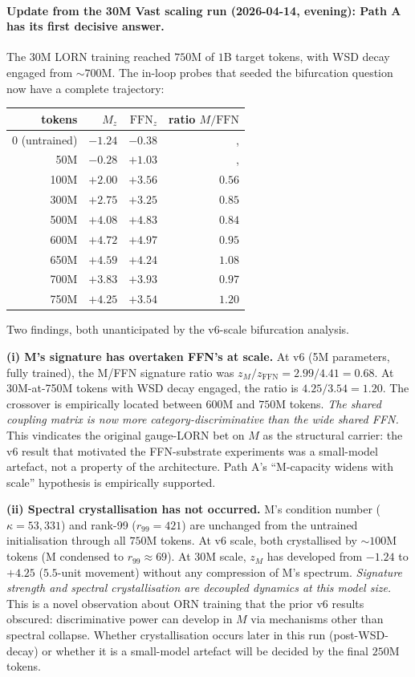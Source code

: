 \documentclass[11pt, a4paper]{article}
\theoremstyle{plain}
\theoremstyle{definition}
\theoremstyle{remark}
\begin{document}
\paragraph{Update from the 30M Vast scaling run (2026-04-14, evening): Path A has its first decisive answer.}
The 30M LORN training reached $750$M of $1$B target tokens, with WSD decay engaged from $\sim 700$M.
The in-loop probes that seeded the bifurcation question now have a complete trajectory:
\begin{center}
\small
\begin{tabular}{rrrr}
\toprule
tokens & $M_z$ & $\mathrm{FFN}_z$ & ratio $M/\mathrm{FFN}$ \\
\midrule
0 (untrained)  & $-1.24$ & $-0.38$ & ,  \\
50M            & $-0.28$ & $+1.03$ & ,  \\
100M           & $+2.00$ & $+3.56$ & $0.56$ \\
300M           & $+2.75$ & $+3.25$ & $0.85$ \\
500M           & $+4.08$ & $+4.83$ & $0.84$ \\
600M           & $+4.72$ & $+4.97$ & $0.95$ \\
650M           & $+4.59$ & $+4.24$ & $\mathbf{1.08}$ \\
700M           & $+3.83$ & $+3.93$ & $0.97$ \\
750M           & $\mathbf{+4.25}$ & $+3.54$ & $\mathbf{1.20}$ \\
\bottomrule
\end{tabular}
\end{center}

Two findings, both unanticipated by the v6-scale bifurcation analysis.

\textbf{(i) M's signature has overtaken FFN's at scale.}
At v6 (5M parameters, fully trained), the M/FFN signature ratio was $z_M / z_{\mathrm{FFN}} = 2.99 / 4.41 = 0.68$.
At 30M-at-750M tokens with WSD decay engaged, the ratio is $4.25 / 3.54 = 1.20$.
The crossover is empirically located between $600$M and $750$M tokens.
\emph{The shared coupling matrix is now more category-discriminative than the wide shared FFN.}
This vindicates the original gauge-LORN bet on $M$ as the structural carrier: the v6 result that motivated the FFN-substrate experiments was a small-model artefact, not a property of the architecture.
Path A's ``M-capacity widens with scale'' hypothesis is empirically supported.

\textbf{(ii) Spectral crystallisation has not occurred.}
M's condition number ($\kappa = 53{,}331$) and rank-99 ($r_{99} = 421$) are unchanged from the untrained initialisation through all $750$M tokens.
At v6 scale, both crystallised by $\sim 100$M tokens (M condensed to $r_{99} \approx 69$).
At 30M scale, $z_M$ has developed from $-1.24$ to $+4.25$ ($5.5$-unit movement) without any compression of M's spectrum.
\emph{Signature strength and spectral crystallisation are decoupled dynamics at this model size.}
This is a novel observation about ORN training that the prior v6 results obscured: discriminative power can develop in $M$ via mechanisms other than spectral collapse.
Whether crystallisation occurs later in this run (post-WSD-decay) or whether it is a small-model artefact will be decided by the final $250$M tokens.
\end{document}
